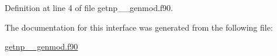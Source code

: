 Definition at line 4 of file getnp\+\_\+\+\_\+genmod.\+f90.



The documentation for this interface was generated from the following file\+:\begin{DoxyCompactItemize}
\item 
\hyperlink{getnp____genmod_8f90}{getnp\+\_\+\+\_\+genmod.\+f90}\end{DoxyCompactItemize}
